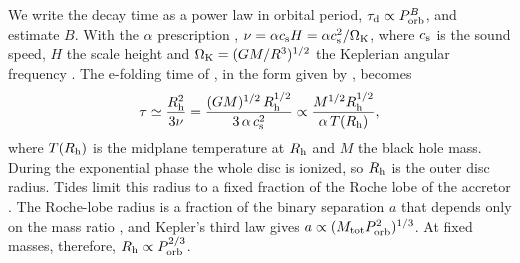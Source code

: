 \documentclass[fleqn,usenatbib]{mnras}
\newcommand{\taud}{\tau_{\rm d}}
\newcommand{\porb}{P_{\rm orb}}
\begin{document}
We write the decay time as a power law in orbital period, $\taud\propto\porb^{B}$, and estimate $B$. With the $\alpha$ prescription \citep{ShakuraSunyaev1973}, $\nu=\alpha c_{\rm s}H=\alpha c_{\rm s}^2/\Omega_{\rm K}$, where $c_{\rm s}$ is the sound speed, $H$ the scale height and $\Omega_{\rm K}=(GM/R^3)^{1/2}$ the Keplerian angular frequency \citep{FrankKingRaine2002}. The e-folding time of \citet{KingRitter1998}, in the form given by \citet{Shahbaz1998}, becomes
\begin{equation}
\tau\simeq\frac{R_{\rm h}^2}{3\nu}=\frac{(GM)^{1/2}\,R_{\rm h}^{1/2}}{3\,\alpha\,c_{\rm s}^2}\propto\frac{M^{1/2}R_{\rm h}^{1/2}}{\alpha\,T(R_{\rm h})},
\label{eq:tau}
\end{equation}
where $T(R_{\rm h})$ is the midplane temperature at $R_{\rm h}$ and $M$ the black hole mass. During the exponential phase the whole disc is ionized, so $R_{\rm h}$ is the outer disc radius. Tides limit this radius to a fixed fraction of the Roche lobe of the accretor \citep[][who use 80 per cent]{Shahbaz1998}. The Roche-lobe radius is a fraction of the binary separation $a$ that depends only on the mass ratio \citep{Eggleton1983}, and Kepler's third law gives $a\propto(M_{\rm tot}\porb^2)^{1/3}$. At fixed masses, therefore, $R_{\rm h}\propto\porb^{2/3}$.
\end{document}
